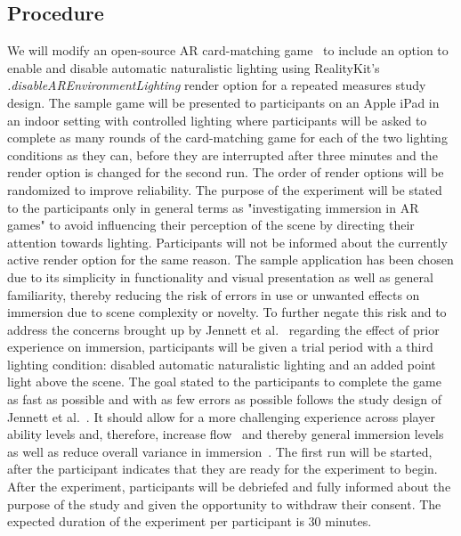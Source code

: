 \documentclass[12pt,twoside,english]{article}
\begin{document}
\subsection{Procedure}
\label{sect:procedure}

We will modify an open-source \gls{AR} card-matching game~\cite{cobb_maxxfrazerrealitykit-cardflip_2020} to include an option to enable and disable automatic naturalistic lighting using RealityKit's \textit{.disableAREnvironmentLighting} render option for a repeated measures study design.
The sample game will be presented to participants on an Apple iPad in an indoor setting with controlled lighting where participants will be asked to complete as many rounds of the card-matching game for each of the two lighting conditions as they can, before they are interrupted after three minutes and the render option is changed for the second run.
The order of render options will be randomized to improve reliability.
The purpose of the experiment will be stated to the participants only in general terms as "investigating immersion in \gls{AR} games" to avoid influencing their perception of the scene by directing their attention towards lighting.
Participants will not be informed about the currently active render option for the same reason.
The sample application has been chosen due to its simplicity in functionality and visual presentation as well as general familiarity, thereby reducing the risk of errors in use or unwanted effects on immersion due to scene complexity or novelty.
To further negate this risk and to address the concerns brought up by Jennett et al.~\cite{jennett_measuring_2008} regarding the effect of prior experience on immersion, participants will be given a trial period with a third lighting condition: disabled automatic naturalistic lighting and an added point light above the scene.
The goal stated to the participants to complete the game as fast as possible and with as few errors as possible follows the study design of Jennett et al.~\cite{jennett_measuring_2008}.
It should allow for a more challenging experience across player ability levels and, therefore, increase flow~\cite{csikszentmihalyi_flow_1990} and thereby general immersion levels as well as reduce overall variance in immersion~\cite{jennett_measuring_2008}.
The first run will be started, after the participant indicates that they are ready for the experiment to begin.
After the experiment, participants will be debriefed and fully informed about the purpose of the study and given the opportunity to withdraw their consent.
The expected duration of the experiment per participant is 30 minutes.
\end{document}
